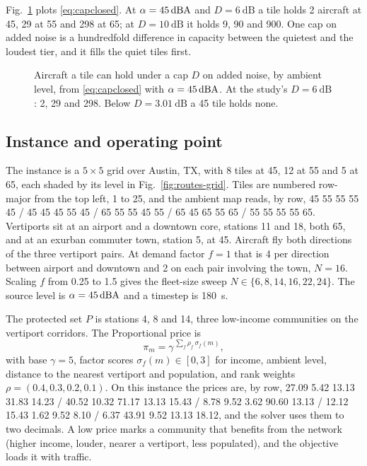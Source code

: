 Fig.~\ref{fig:capacity} plots \eqref{eq:capclosed}. At $\alpha=45\,\textup{dBA}$ and
$D=\SI{6}{\dB}$ a tile holds 2 aircraft at \SI{45}{\dBA}, 29 at \SI{55}{\dBA} and 298 at
\SI{65}{\dBA}; at $D=\SI{10}{\dB}$ it holds 9, 90 and 900. One cap on added noise is a
hundredfold difference in capacity between the quietest and the loudest tier, and it
fills the quiet tiles first.

\begin{figure}[t]
\centering

\caption{Aircraft a tile can hold under a cap $D$ on added noise, by ambient level, from
\eqref{eq:capclosed} with $\alpha=45\,\textup{dBA}$. At the study's $D=\SI{6}{\dB}$: 2, 29
and 298. Below $D=\SI{3.01}{\dB}$ a \SI{45}{\dBA} tile holds none.}
\label{fig:capacity}
\end{figure}

\subsection{Instance and operating point}
\label{sec:instance}

The instance is a $5\times5$ grid over Austin, TX, with 8 tiles at \SI{45}{\dBA}, 12 at
\SI{55}{\dBA} and 5 at \SI{65}{\dBA}, each shaded by its level in
Fig.~\ref{fig:routes-grid}. Tiles are numbered row-major from the top left, 1 to 25, and
the ambient map reads, by row, 45 55 55 55 45 / 45 45 45 55 45 / 65 55 55 45 55 / 65 45
65 55 65 / 55 55 55 55 \SI{65}{\dBA}. Vertiports sit at an airport and a downtown core,
stations 11 and 18, both \SI{65}{\dBA}, and at an exurban commuter town, station 5, at
\SI{45}{\dBA}. Aircraft fly both directions of the three vertiport pairs. At demand
factor $f=1$ that is 4 per direction between airport and downtown and 2 on each pair
involving the town, $N=16$. Scaling $f$ from 0.25
to 1.5 gives the fleet-size sweep $N\in\{6,8,14,16,22,24\}$. The source level is
$\alpha=45\,\textup{dBA}$ and a timestep is \SI{180}{\second}.

The protected set $P$ is stations 4, 8 and 14, three low-income communities on the
vertiport corridors. The Proportional price is
\begin{equation}
\pi_m=\gamma^{\,\sum_f\rho_f\,\sigma_f(m)} ,
\label{eq:price}
\end{equation}
with base $\gamma=5$, factor scores $\sigma_f(m)\in[0,3]$ for income, ambient level,
distance to the nearest vertiport and population, and rank weights
$\rho=(0.4,0.3,0.2,0.1)$. On this instance the prices are, by row, 27.09 5.42 13.13
31.83 14.23 / 40.52 10.32 71.17 13.13 15.43 / 8.78 9.52 3.62 90.60 13.13 / 12.12 15.43
1.62 9.52 8.10 / 6.37 43.91 9.52 13.13 18.12, and the solver uses them to two decimals. A low price marks a community that benefits from the network
(higher income, louder, nearer a vertiport, less populated), and the objective loads it
with traffic.

